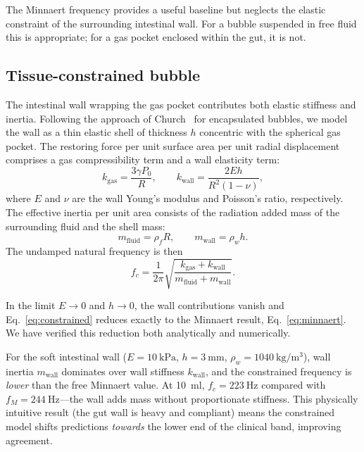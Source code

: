 \documentclass[review]{elsarticle}
\begin{document}
The Minnaert frequency provides a useful baseline but neglects the elastic
constraint of the surrounding intestinal wall.  For a bubble suspended in
free fluid this is appropriate; for a gas pocket enclosed within the gut, it
is not.

\subsection{Tissue-constrained bubble}
\label{sec:constrained}

The intestinal wall wrapping the gas pocket contributes both elastic
stiffness and inertia.  Following the approach of Church~\cite{Church1995}
for encapsulated bubbles, we model the wall as a thin elastic shell of
thickness $h$ concentric with the spherical gas pocket.  The restoring force
per unit surface area per unit radial displacement comprises a gas
compressibility term and a wall elasticity term:
\begin{equation}
  k_\mathrm{gas} = \frac{3\gamma P_0}{R}, \qquad
  k_\mathrm{wall} = \frac{2Eh}{R^2(1-\nu)},
  \label{eq:stiffness}
\end{equation}
where $E$ and $\nu$ are the wall Young's modulus and Poisson's ratio,
respectively.  The effective inertia per unit area consists of the radiation
added mass of the surrounding fluid and the shell mass:
\begin{equation}
  m_\mathrm{fluid} = \rho_f R, \qquad
  m_\mathrm{wall} = \rho_w h.
  \label{eq:mass}
\end{equation}
The undamped natural frequency is then
\begin{equation}
  f_c = \frac{1}{2\pi}\sqrt{\frac{k_\mathrm{gas} + k_\mathrm{wall}}
    {m_\mathrm{fluid} + m_\mathrm{wall}}}.
  \label{eq:constrained}
\end{equation}

In the limit $E \to 0$ and $h \to 0$, the wall contributions vanish and
Eq.~\eqref{eq:constrained} reduces exactly to the Minnaert result,
Eq.~\eqref{eq:minnaert}.  We have verified this reduction both analytically
and numerically.

For the soft intestinal wall ($E = \SI{10}{\kilo\pascal}$,
$h = \SI{3}{\milli\metre}$, $\rho_w = \SI{1040}{\kilogram\per\metre\cubed}$),
wall inertia $m_\mathrm{wall}$ dominates over wall stiffness
$k_\mathrm{wall}$, and the constrained frequency is \emph{lower} than the
free Minnaert value.  At \SI{10}{\milli\litre},
$f_c = \SI{223}{\hertz}$ compared with $f_M = \SI{244}{\hertz}$---the wall
adds mass without proportionate stiffness.  This physically intuitive result
(the gut wall is heavy and compliant) means the constrained model shifts
predictions \emph{towards} the lower end of the clinical band, improving
agreement.
\end{document}
